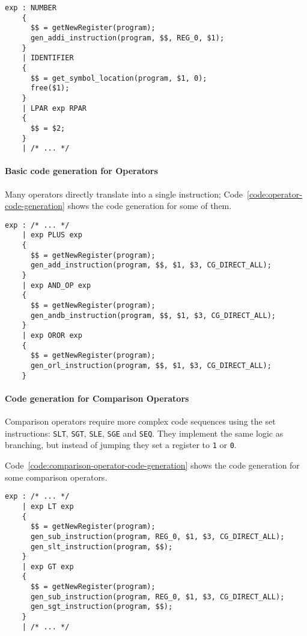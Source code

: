 \begin{onepage}
  \begin{lstlisting}[language=LANCE, caption={Expression code generation grammar}, label={code:expression-code-generation-grammar}]
exp : NUMBER
    {
      $$ = getNewRegister(program);
      gen_addi_instruction(program, $$, REG_0, $1);
    }
    | IDENTIFIER
    {
      $$ = get_symbol_location(program, $1, 0);
      free($1);
    }
    | LPAR exp RPAR
    {
      $$ = $2;
    }
    | /* ... */
\end{lstlisting}
\end{onepage}

\paragraph*{Basic code generation for Operators}

Many operators directly translate into a single \mace instruction;
Code~\ref{code:operator-code-generation} shows the code generation for some of them.

\begin{onepage}
  \begin{lstlisting}[language=LANCE, caption={Operator code generation}, label={code:operator-code-generation}]
exp : /* ... */
    | exp PLUS exp
    {
      $$ = getNewRegister(program);
      gen_add_instruction(program, $$, $1, $3, CG_DIRECT_ALL);
    }
    | exp AND_OP exp
    {
      $$ = getNewRegister(program);
      gen_andb_instruction(program, $$, $1, $3, CG_DIRECT_ALL);
    }
    | exp OROR exp
    {
      $$ = getNewRegister(program);
      gen_orl_instruction(program, $$, $1, $3, CG_DIRECT_ALL);
    }
\end{lstlisting}
\end{onepage}

\paragraph*{Code generation for Comparison Operators}

Comparison operators require more complex code sequences using the set instructions:
\texttt{SLT}, \texttt{SGT}, \texttt{SLE}, \texttt{SGE} and \texttt{SEQ}.
They implement the same logic as branching, but instead of jumping they set a register to \texttt{1} or \texttt{0}.

Code~\ref{code:comparison-operator-code-generation} shows the code generation for some comparison operators.

\begin{onepage}
  \begin{lstlisting}[language=LANCE, caption={Comparison operator code generation}, label={code:comparison-operator-code-generation}]
exp : /* ... */
    | exp LT exp
    {
      $$ = getNewRegister(program);
      gen_sub_instruction(program, REG_0, $1, $3, CG_DIRECT_ALL);
      gen_slt_instruction(program, $$);
    }
    | exp GT exp
    {
      $$ = getNewRegister(program);
      gen_sub_instruction(program, REG_0, $1, $3, CG_DIRECT_ALL);
      gen_sgt_instruction(program, $$);
    }
    | /* ... */
\end{lstlisting}
\end{onepage}

